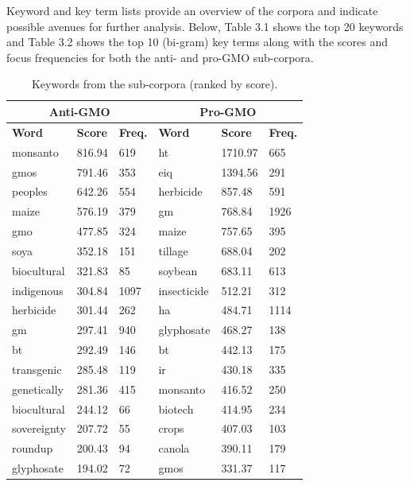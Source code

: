 Keyword and key term lists provide an overview of the corpora and indicate possible avenues for further analysis. Below, Table 3.1 shows the top 20 keywords and Table 3.2 shows the top 10 (bi-gram) key terms along with the scores and focus frequencies for both the anti- and pro-GMO sub-corpora. 

\begin{table}[H]
\begin{footnotesize}
\centering
\def\arraystretch{1.1}%
\begin{tabular}{llllll}
\hline
\multicolumn{3}{c}{\textbf{Anti-GMO}}    & \multicolumn{3}{c}{\textbf{Pro-GMO}}   \\
\hline
\textbf{Word}        & \textbf{Score}  & \textbf{Freq.} & \textbf{Word}        & \textbf{Score}   & \textbf{Freq.} \\
\hline
monsanto    & 816.94 & 619   & ht          & 1710.97 & 665   \\
gmos        & 791.46 & 353   & eiq         & 1394.56 & 291   \\
peoples     & 642.26 & 554   & herbicide   & 857.48  & 591   \\
maize       & 576.19 & 379   & gm          & 768.84  & 1926  \\
gmo         & 477.85 & 324   & maize       & 757.65  & 395   \\
soya        & 352.18 & 151   & tillage     & 688.04  & 202   \\
biocultural & 321.83 & 85    & soybean     & 683.11  & 613   \\
indigenous  & 304.84 & 1097  & insecticide & 512.21  & 312   \\
herbicide   & 301.44 & 262   & ha          & 484.71  & 1114  \\
gm          & 297.41 & 940   & glyphosate  & 468.27  & 138   \\
bt          & 292.49 & 146   & bt          & 442.13  & 175   \\
transgenic  & 285.48 & 119   & ir          & 430.18  & 335   \\
genetically & 281.36 & 415   & monsanto    & 416.52  & 250   \\
biocultural & 244.12 & 66    & biotech     & 414.95  & 234   \\
sovereignty & 207.72 & 55    & crops       & 407.03  & 103   \\
roundup     & 200.43 & 94    & canola      & 390.11  & 179   \\
glyphosate  & 194.02 & 72    & gmos        & 331.37  & 117  
\end{tabular}
\caption{Keywords from the sub-corpora (ranked by score).}
\label{tab:table1}
\end{footnotesize}
\end{table}

